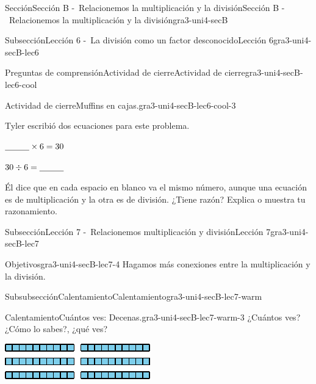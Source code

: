 \documentclass[twoside,10pt,]{article}
\begin{document}
\begin{sectionptx}{Sección}{Sección B -~Relacionemos la multiplicación y la división}{}{Sección B -~Relacionemos la multiplicación y la división}{}{}{gra3-uni4-secB}
\begin{subsectionptx}{Subsección}{Lección 6 -~La división como un factor desconocido}{}{Lección 6}{}{}{gra3-uni4-secB-lec6}
\begin{reading-questions-subsubsection}{Preguntas de comprensión}{Actividad de cierre}{}{Actividad de cierre}{}{}{gra3-uni4-secB-lec6-cool}
\begin{project}{Actividad de cierre}{Muffins en cajas.}{gra3-uni4-secB-lec6-cool-3}
\begin{sidebyside}{2}{0.05}{0.05}{0.1}%
\begin{sbspanel}{0.4}%
Tyler escribió dos ecuaciones para este problema.%
\end{sbspanel}%
\begin{sbspanel}{0.4}%
\(\underline{\hspace{1 cm}} \times 6 = 30\)%
\par
\(30 \div 6 = \underline{\hspace{1 cm}}\)%
\end{sbspanel}%
\end{sidebyside}%
\par
Él dice que en cada espacio en blanco va el mismo número, aunque una ecuación es de multiplicación y la otra es de división. ¿Tiene razón? Explica o muestra tu razonamiento.%
\end{project}%
\end{reading-questions-subsubsection}
\end{subsectionptx}
%
%
\typeout{************************************************}
\typeout{************************************************}
%
\begin{subsectionptx}{Subsección}{Lección 7 -~Relacionemos multiplicación y división}{}{Lección 7}{}{}{gra3-uni4-secB-lec7}
\begin{objectives}{Objetivos}{gra3-uni4-secB-lec7-4}
Hagamos más conexiones entre la multiplicación y la división.%
\end{objectives}
%
%
\typeout{************************************************}
\typeout{************************************************}
%
\begin{subsubsectionptx}{Subsubsección}{Calentamiento}{}{Calentamiento}{}{}{gra3-uni4-secB-lec7-warm}
\begin{exploration}{Calentamiento}{Cuántos ves: Decenas.}{gra3-uni4-secB-lec7-warm-3}%
¿Cuántos ves? ¿Cómo lo sabes?, ¿qué ves?%
\begin{image}{0}{1}{0}{}%
\includegraphics[width=\linewidth]{external/svg-source/tikz-file-147480.pdf}

\end{image}
\end{exploration}
\end{subsubsectionptx}
\end{subsectionptx}
\end{sectionptx}
\end{document}
